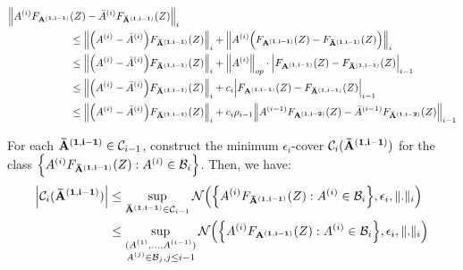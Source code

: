 \begin{proof*}
    \begin{align*}
        \Big\|
            A^{(i)}F_{\bf A^{(1, i-1)}}&(Z) - {\bar A}^{(i)}F_{\bf {\bar A}^{(1, i-1)}}(Z)
        \Big\|_i \\
            &\le \Big\|\Big( A^{(i)} - {\bar A}^{(i)} \Big)F_{\bf {\bar A}^{(1, i-1)}}(Z) \Big\|_i 
                + \Big\| A^{(i)}\Big( F_{\bf A^{(1, i-1)}}(Z) - F_{\bf {\bar A}^{(1, i-1)}}(Z) \Big)\Big\|_i \\
            &\le \Big\|\Big( A^{(i)} - {\bar A}^{(i)} \Big)F_{\bf {\bar A}^{(1, i-1)}}(Z) \Big\|_i 
                + \Big\|A^{(i)}\Big\|_{op} \cdot\Big| F_{\bf A^{(1, i-1)}}(Z) - F_{\bf {\bar A}^{(1, i-1)}}(Z) \Big|_{i-1} \\
            &\le \Big\|\Big( A^{(i)} - {\bar A}^{(i)} \Big)F_{\bf {\bar A}^{(1, i-1)}}(Z) \Big\|_i 
                + c_i\Big| F_{\bf A^{(1, i-1)}}(Z) - F_{\bf {\bar A}^{(1, i-1)}}(Z) \Big|_{i-1} \\
            &\le \Big\|\Big( A^{(i)} - {\bar A}^{(i)} \Big)F_{\bf {\bar A}^{(1, i-1)}}(Z) \Big\|_i 
                + c_i\rho_{i-1}\Big\| A^{(i-1)}F_{\bf A^{(1, i-2)}}(Z) - {\bar A}^{(i-1)}F_{\bf {\bar A}^{(1, i-2)}}(Z) \Big\|_{i-1} 
    \end{align*}

    \noindent\newline For each ${\bf {\bar A}^{(1, i-1)}}\in \mathcal{C}_{i-1}$, construct the minimum $\epsilon_i$-cover $\mathcal{C}_i({\bf {\bar A}^{(1, i-1)}})$ for the class \newline$\Big\{ A^{(i)}F_{\bf {\bar A}^{(1, i-1)}}(Z) : A^{(i)} \in \mathcal{B}_i \Big\}$. Then, we have:
    \begin{align*}
        \Big| 
            \mathcal{C}_i({\bf {\bar A}^{(1, i-1)}})
         \Big| &\le \sup_{{\bf {\bar A}^{(1, i-1)}}\in\mathcal{C}_{i-1}} \mathcal{N}\Big( 
            \Big\{ 
                A^{(i)}F_{\bf {\bar A}^{(1, i-1)}}(Z) : A^{(i)}\in\mathcal{B}_i 
             \Big\}, \epsilon_i, \|.\|_i
         \Big) \\
        &\le \sup_{
            \substack{
                (A^{(1)}, \dots, A^{(i-1)}) \\
                A^{(j)}\in\mathcal{B}_j, j \le i-1
            }    
        } \mathcal{N}\Big( 
            \Big\{ 
                A^{(i)}F_{\bf A^{(1, i-1)}}(Z) : A^{(i)} \in \mathcal{B}_i
             \Big\}, \epsilon_i, \|.\|_i
         \Big)
    \end{align*}


\end{proof*}
